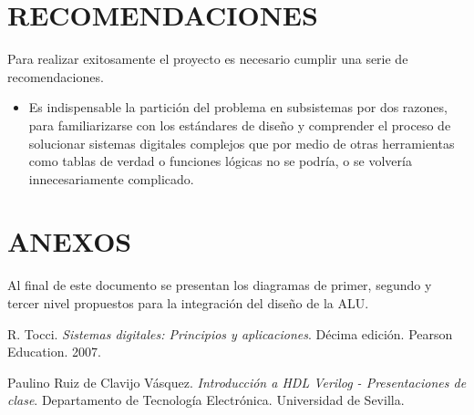 \documentclass[journal,trans]{IEEEtran}
\begin{document}
\section{RECOMENDACIONES}
Para realizar exitosamente el proyecto es necesario cumplir una serie de recomendaciones.
\begin{itemize}
    \item Es indispensable la partición del problema en subsistemas por dos razones, para familiarizarse con los estándares de diseño y comprender el proceso de solucionar sistemas digitales complejos que por medio de otras herramientas como tablas de verdad o funciones lógicas no se podría, o se volvería innecesariamente complicado.
\end{itemize}


\section{ANEXOS}
Al final de este documento se presentan los diagramas de primer, segundo y tercer nivel propuestos para la integración del diseño de la ALU. 

\begin{comment}
    El índice de los diagramas es el siguiente:
    \begin{itemize}
        \item Página 1. Diagrama de primer nivel.
        \item Página 2. Diagrama de segundo nivel.
        \item Página 3. Diagrama de tercer nivel: XOR, AND, OR y desplazamiento a la derecha.
        \item Página 4. Diagrama de tercer nivel: Banderas de Zero, Paridad, y de Desbordamiento.
        \item Página 5. Diagrama de tercer nivel: multiplicador con signo.
        \item Página 6. Diagrama de tercer nivel: detalle multiplicador.
        \item Página 7. Diagrama de tercer nivel circuito sumador y restador.
        \item Página 8. Diagrama de tercer nivel del circuito quintuplicador.
    \end{itemize}
\end{comment}

\begin{thebibliography}{1}

R. Tocci. \emph{Sistemas digitales: Principios y aplicaciones}. Décima edición. Pearson Education. 2007.

Paulino Ruiz de Clavijo Vásquez. \emph{Introducción a HDL Verilog - Presentaciones de clase}. Departamento de Tecnología Electrónica. Universidad de Sevilla.



\end{thebibliography}
\end{document}

